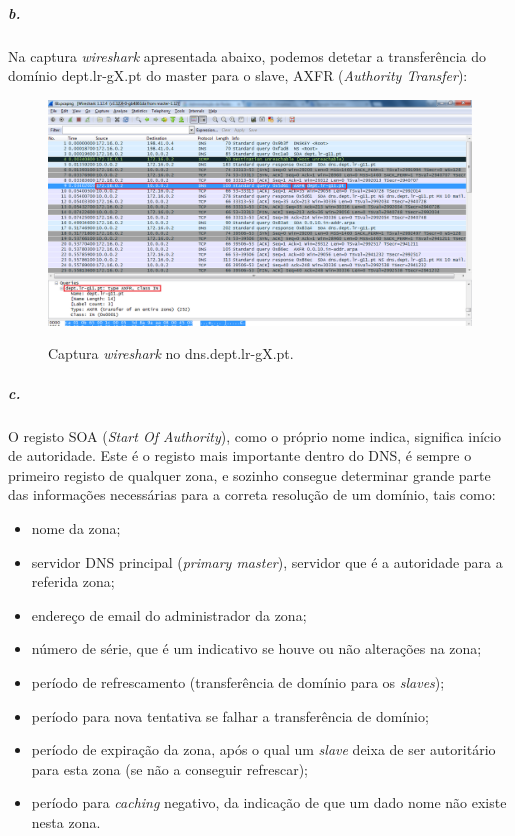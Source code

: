 \newpage
\subparagraph{b.}
Na captura \emph{wireshark} apresentada abaixo, podemos detetar a transferência do domínio \textsf{dept.lr-gX.pt} do \textsf{master} para o \textsf{slave}, \textsf{AXFR} (\emph{Authority Transfer}):

\begin{figure}[h]
\centering
\includegraphics[width=1\textwidth, height=0.38\textheight]{6b_cap.png}
\label{fig:2-capturaWireshark}
\caption{Captura \emph{wireshark} no \textsf{dns.dept.lr-gX.pt}.}
\end{figure}


\subparagraph{c.}
O registo SOA (\emph{Start Of Authority}), como o próprio nome indica, significa início de autoridade. Este é o registo mais importante dentro do DNS, é sempre o primeiro registo de qualquer zona, e sozinho consegue determinar grande parte das informações necessárias para a correta resolução de um domínio, tais como:
\begin{itemize}
\item nome da zona;
\item servidor DNS principal (\emph{primary master}), servidor que é a autoridade para a referida zona;
\item endereço de email do administrador da zona;
\item número de série, que é um indicativo se houve ou não alterações na zona;
\item período de refrescamento (transferência de domínio para os \emph{slaves});
\item período para nova tentativa se falhar a transferência de domínio;
\item período de expiração da zona, após o qual um \emph{slave} deixa de ser autoritário para esta zona (se não a conseguir refrescar);
\item período para \emph{caching} negativo, da indicação de que um dado nome não existe nesta zona.
\end{itemize}

